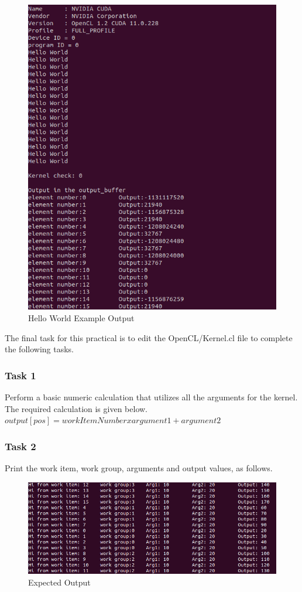\begin{figure}[H]
\centering
\includegraphics[width=0.6\columnwidth]{Figures/helloWorld.png}
\caption{Hello World Example Output}
\label{fig:Hello World}
\end{figure}

The final task for this practical is to edit the OpenCL/Kernel.cl file to complete the following tasks.

\subsubsection{Task 1}
Perform a basic numeric calculation that utilizes all the arguments for the kernel. The required calculation is given below. \newline
\newline
\begin{math} 
output[pos] = work Item Number x argument 1 + argument 2
\end{math}

\subsubsection{Task 2}
Print the work item, work group, arguments and output values, as follows.

\begin{figure}[H]
\centering
\includegraphics[width=0.9\columnwidth]{Figures/workItemOutput.png}
\caption{Expected Output}
\label{fig:Expected 1}
\end{figure}

